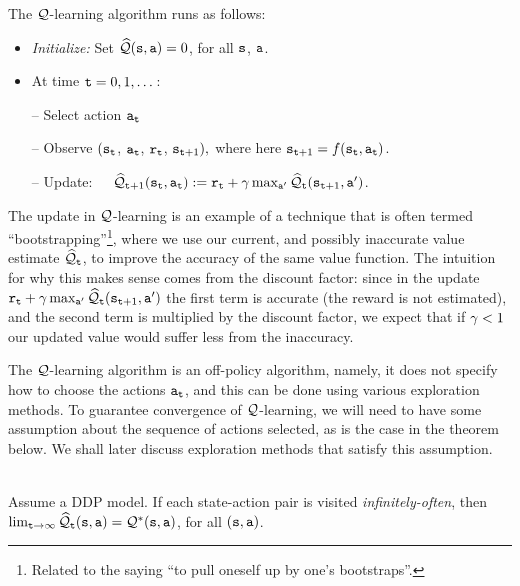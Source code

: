 The $\mathcal{Q}$-learning algorithm runs as follows:
\begin{itemize}
\item {\em Initialize:} Set $\widehat{\mathcal{Q}}({\tt s},{\tt a})=0$, for all ${\tt s}$, ${\tt a}$.
\item At time ${\tt t}=0,1,\dots$:

-- Select action ${\tt a}_{\tt t}$

-- Observe $({\tt s}_{\tt t}$, ${\tt a}_{\tt t}$, ${\tt r}_{\tt t}$,
${\tt s}_{{\tt t}+1}),$
where here ${\tt s}_{{\tt t}+1}=f({\tt s}_{\tt t},{\tt a}_{\tt t})$.

-- Update:\ \ \
$\widehat{\mathcal{Q}}_{{\tt t}+1}({\tt s}_{\tt t},{\tt a}_{\tt t}) :=
{\tt r}_{\tt t}+\gamma \max_{{\tt a}'}
\widehat{\mathcal{Q}}_{\tt t}({\tt s}_{{\tt t}+1},{\tt a}')$.
\end{itemize}

The update in $\mathcal{Q}$-learning is an example of a technique that is often termed ``bootstrapping''\footnote{Related to the saying ``to pull oneself up by one's bootstraps''.}, where we use our current, and possibly inaccurate value estimate $\widehat{\mathcal{Q}}_{\tt t}$, to improve the accuracy of the same value function. The intuition for why this makes sense comes from the discount factor: since in the update ${\tt r}_{\tt t}+\gamma \max_{{\tt a}'}
\widehat{\mathcal{Q}}_{\tt t}({\tt s}_{{\tt t}+1},{\tt a}')$ the first term is accurate (the reward is not estimated), and the second term is multiplied by the discount factor, we expect that if $\gamma<1$ our updated value would suffer less from the inaccuracy. 

The $\mathcal{Q}$-learning algorithm is an off-policy algorithm, namely, it does not specify how to choose the actions
${\tt a}_{\tt t}$, and this can be done using various exploration methods.
To guarantee convergence of $\mathcal{Q}$-learning, we will need to have some assumption about the
sequence of actions selected, as is the case in the theorem below. We shall later discuss exploration methods that satisfy this assumption.

\begin{theorem}\ \\
Assume a DDP model.
If each state-action pair is visited {\em infinitely-often}, then
$\lim_{{\tt t}\to\infty}\widehat{\mathcal{Q}}_{\tt t}({\tt s},{\tt a})=\mathcal{Q}^*({\tt s},{\tt a})$,
for all $({\tt s},{\tt a})$.
\end{theorem}

